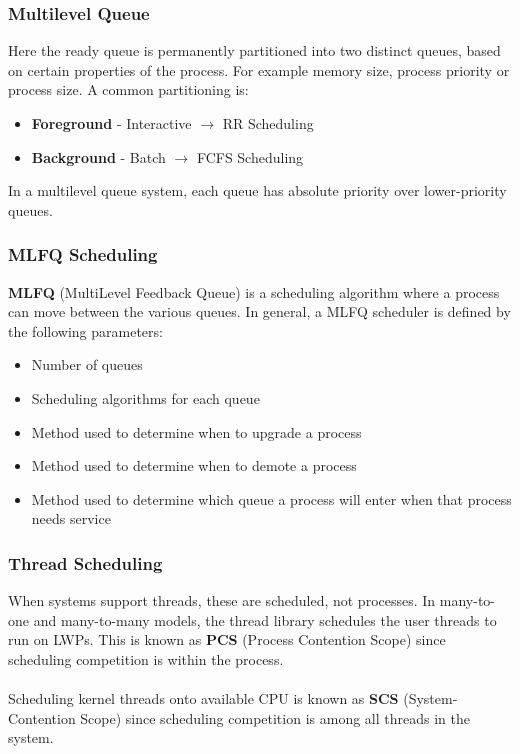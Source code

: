 \documentclass{article}
\begin{document}
\subsubsection{Multilevel Queue}
Here the ready queue is permanently partitioned into two distinct queues, based on certain properties of the process. For example memory size, process priority or process size. A common partitioning is:

\begin{itemize}
	\item \textbf{Foreground} - Interactive $\rightarrow$ RR Scheduling
	\item \textbf{Background} - Batch $\rightarrow$ FCFS Scheduling
\end{itemize}
In a multilevel queue system, each queue has absolute priority over lower-priority queues.

\subsubsection{MLFQ Scheduling}
\textbf{MLFQ} (MultiLevel Feedback Queue) is a scheduling algorithm where a process can move between the various queues. In general, a MLFQ scheduler is defined by the following parameters:

\begin{itemize}
	\item Number of queues
	\item Scheduling algorithms for each queue
	\item Method used to determine when to upgrade a process
	\item Method used to determine when to demote a process
	\item Method used to determine which queue a process will enter when that process needs service
\end{itemize}

\subsubsection{Thread Scheduling}

When systems support threads, these are scheduled, not processes. In many-to-one and many-to-many models, the thread library schedules the user threads to run on LWPs. This is known as \textbf{PCS} (Process Contention Scope) since scheduling competition is within the process. \\ \\
Scheduling kernel threads onto available CPU is known as \textbf{SCS} (System-Contention Scope) since scheduling competition is among all threads in the system.
\end{document}
